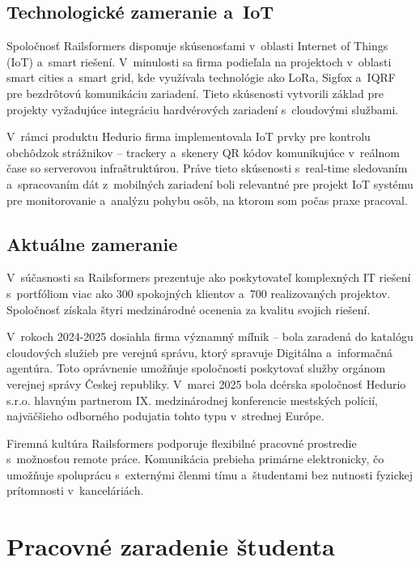 \subsection{Technologické zameranie a~IoT}
\label{sec:IoT}

Spoločnosť Railsformers disponuje skúsenosťami v~oblasti Internet of Things (IoT) a~smart riešení. V~minulosti sa firma podieľala na projektoch v~oblasti smart cities a~smart grid, kde využívala technológie ako LoRa, Sigfox a~IQRF pre bezdrôtovú komunikáciu zariadení. Tieto skúsenosti vytvorili základ pre projekty vyžadujúce integráciu hardvérových zariadení s~cloudovými službami.

V~rámci produktu Hedurio firma implementovala IoT prvky pre kontrolu obchôdzok strážnikov -- trackery a~skenery QR kódov komunikujúce v~reálnom čase so serverovou infraštruktúrou. Práve tieto skúsenosti s~real-time sledovaním a~spracovaním dát z~mobilných zariadení boli relevantné pre projekt IoT systému pre monitorovanie a~analýzu pohybu osôb, na ktorom som počas praxe pracoval.

\subsection{Aktuálne zameranie}
\label{sec:AktualniZamereni}

V~súčasnosti sa Railsformers prezentuje ako poskytovateľ komplexných IT riešení s~portfóliom viac ako 300 spokojných klientov a~700 realizovaných projektov. Spoločnosť získala štyri medzinárodné ocenenia za kvalitu svojich riešení.

V~rokoch 2024-2025 dosiahla firma významný míľnik -- bola zaradená do katalógu cloudových služieb pre verejnú správu, ktorý spravuje Digitálna a~informačná agentúra. Toto oprávnenie umožňuje spoločnosti poskytovať služby orgánom verejnej správy Českej republiky. V~marci 2025 bola dcérska spoločnosť Hedurio s.r.o. hlavným partnerom IX. medzinárodnej konferencie mestských polícií, najväčšieho odborného podujatia tohto typu v~strednej Európe.

Firemná kultúra Railsformers podporuje flexibilné pracovné prostredie s~možnosťou remote práce. Komunikácia prebieha primárne elektronicky, čo umožňuje spoluprácu s~externými členmi tímu a~študentami bez nutnosti fyzickej prítomnosti v~kanceláriách.


\section{Pracovné zaradenie študenta}
\label{sec:PracovniZarazeni}

